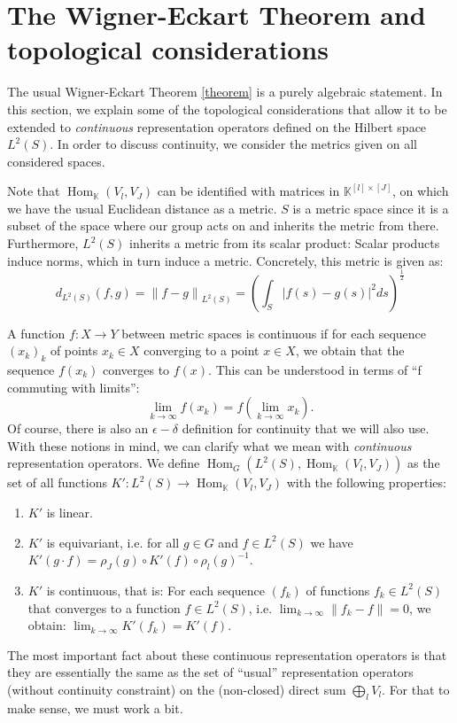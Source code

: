 \documentclass[12pt, a4paper]{article}
\theoremstyle{plain}
\theoremstyle{definition}
\theoremstyle{remark}
\newcommand{\K}{\mathds{K}}
\DeclareMathOperator{\Hom}{Hom}
\begin{document}
\appendix

\section{The Wigner-Eckart Theorem and topological considerations}\label{topological_closures}

The usual Wigner-Eckart Theorem \ref{theorem} is a purely algebraic statement. In this section, we explain some of the topological considerations that allow it to be extended to \emph{continuous} representation operators defined on the Hilbert space $L^2(S)$. In order to discuss continuity, we consider the metrics given on all considered spaces.

Note that $\Hom_{\K}(V_l, V_J)$ can be identified with matrices in $\K^{[l] \times [J]}$, on which we have the usual Euclidean distance as a metric. $S$ is a metric space since it is a subset of the space where our group acts on and inherits the metric from there. Furthermore, $L^2(S)$ inherits a metric from its scalar product: Scalar products induce norms, which in turn induce a metric. Concretely, this metric is given as:
\begin{equation*}
d_{L^2(S)}(f, g) = \left\| f - g\right\|_{L^2(S)} = \left(\int_{S} |f(s) - g(s)|^2 ds\right)^{\frac{1}{2}}
\end{equation*}

A function $f: X \to Y$ between metric spaces is continuous if for each sequence $(x_k)_k$ of points $x_k \in X$ converging to a point $x \in X$, we obtain that the sequence $f(x_k)$ converges to $f(x)$. This can be understood in terms of ``f commuting with limits'':
\begin{equation*}
\lim_{k \to \infty} f(x_k) = f\left(\lim_{k \to \infty} x_k\right).
\end{equation*}
Of course, there is also an $\epsilon-\delta$ definition for continuity that we will also use. With these notions in mind, we can clarify what we mean with \emph{continuous} representation operators. We define $\Hom_{G}(L^2(S), \Hom_{\K}(V_l, V_J))$ as the set of all functions $K': L^2(S) \to \Hom_{\K}(V_l, V_J)$ with the following properties:
\begin{enumerate}
\item $K'$ is linear.
\item $K'$ is equivariant, i.e. for all $g \in G$ and $f \in L^2(S)$ we have $K'(g \cdot f) = \rho_{J}(g) \circ K'(f) \circ \rho_l(g)^{-1}$.
\item $K'$ is continuous, that is: For each sequence $(f_k)$ of functions $f_k \in L^2(S)$ that converges to a function $f \in L^2(S)$, i.e. $ \lim_{k \to \infty} \left\| f_k - f\right\| = 0$, we obtain: $\lim_{k \to \infty} K'(f_k) = K'(f)$.
\end{enumerate}
The most important fact about these continuous representation operators is that they are essentially the same as the set of ``usual'' representation operators (without continuity constraint) on the (non-closed) direct sum $\bigoplus_{l} V_l$. For that to make sense, we must work a bit.
\end{document}

